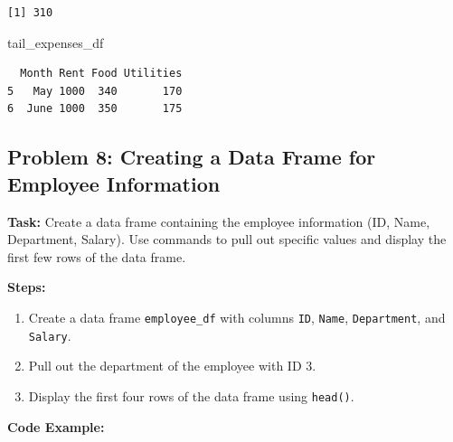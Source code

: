 \documentclass[
  letterpaper,
  DIV=11,
  numbers=noendperiod]{scrreprt}
\newenvironment{Shaded}{\begin{snugshade}}{\end{snugshade}}
\newcommand{\NormalTok}[1]{\textcolor[rgb]{0.00,0.23,0.31}{#1}}
\providecommand{\tightlist}{%
  \setlength{\itemsep}{0pt}\setlength{\parskip}{0pt}}\usepackage{longtable,booktabs,array}
\begin{document}
\begin{verbatim}
[1] 310
\end{verbatim}

\begin{Shaded}
\begin{Highlighting}[]
\NormalTok{tail\_expenses\_df}
\end{Highlighting}
\end{Shaded}

\begin{verbatim}
  Month Rent Food Utilities
5   May 1000  340       170
6  June 1000  350       175
\end{verbatim}

\subsection*{Problem 8: Creating a Data Frame for Employee
Information}\label{problem-8-creating-a-data-frame-for-employee-information}

\textbf{Task:} Create a data frame containing the employee information
(ID, Name, Department, Salary). Use commands to pull out specific values
and display the first few rows of the data frame.

\textbf{Steps:}

\begin{enumerate}
\def\labelenumi{\arabic{enumi}.}
\tightlist
\item
  Create a data frame \texttt{employee\_df} with columns \texttt{ID},
  \texttt{Name}, \texttt{Department}, and \texttt{Salary}.
\item
  Pull out the department of the employee with ID 3.
\item
  Display the first four rows of the data frame using \texttt{head()}.
\end{enumerate}

\textbf{Code Example:}
\end{document}
